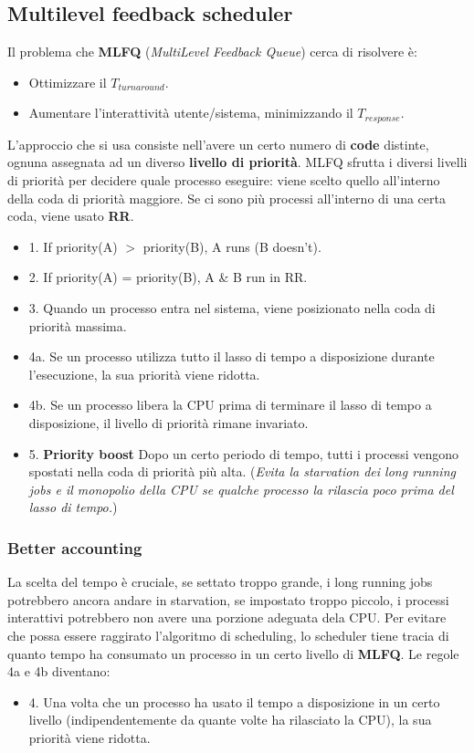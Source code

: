 \documentclass[12pt, letterpaper]{article}
\begin{document}
		\subsection{Multilevel feedback scheduler}
			Il problema che \textbf{MLFQ} (\textit{MultiLevel Feedback Queue}) cerca di risolvere è: 
			\begin{itemize}
				\item Ottimizzare il $T_{turnaround}$.
				\item Aumentare l'interattività utente/sistema, minimizzando il $T_{response}$.
			\end{itemize}
			L'approccio che si usa consiste nell'avere un certo numero di \textbf{code} distinte, ognuna assegnata ad un diverso \textbf{livello di priorità}. MLFQ sfrutta i diversi livelli di priorità per decidere quale processo eseguire: viene scelto quello all'interno della coda di priorità maggiore. Se ci sono più processi all'interno di una certa coda, viene usato \textbf{RR}.
			\begin{itemize}
				\item 1. If priority(A) $>$ priority(B), A runs (B doesn't).
				\item 2. If priority(A) = priority(B), A \& B run in RR.
				\item 3. Quando un processo entra nel sistema, viene posizionato nella coda di priorità massima.
				\item 4a. Se un processo utilizza tutto il lasso di tempo a disposizione durante l'esecuzione, la sua priorità viene ridotta.
				\item 4b. Se un processo libera la CPU prima di terminare il lasso di tempo a disposizione, il livello di priorità rimane invariato.
				\item 5. \textbf{Priority boost }Dopo un certo periodo di tempo, tutti i processi vengono spostati nella coda di priorità più alta. (\textit{Evita la starvation dei long running jobs e il monopolio della CPU se qualche processo la rilascia poco prima del lasso di tempo.})
			\end{itemize}
			
			\subsubsection{Better accounting}
				La  scelta del tempo è cruciale, se settato troppo grande, i long running jobs potrebbero ancora andare in starvation, se impostato troppo piccolo, i processi interattivi potrebbero non avere una porzione adeguata dela CPU. 
				Per evitare che possa essere raggirato l'algoritmo di scheduling, lo scheduler tiene tracia di quanto tempo ha consumato un processo in un certo livello di \textbf{MLFQ}. Le regole 4a e 4b diventano: \\
				\begin{itemize}
					\item 4. Una volta che un processo ha usato il tempo a disposizione in un certo livello (indipendentemente da quante volte ha rilasciato la CPU), la sua priorità viene ridotta.
				\end{itemize}								
				
\end{document}
